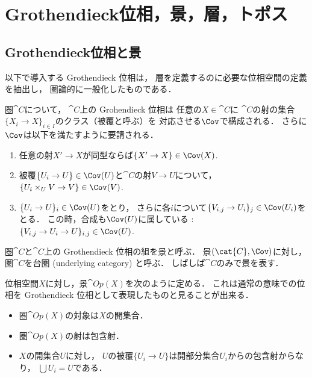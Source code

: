 \section{Grothendieck位相，景，層，トポス}
    \subsection{Grothendieck位相と景}
    以下で導入する Grothendieck 位相は，
    層を定義するのに必要な位相空間の定義を抽出し，
    圏論的に一般化したものである．

    \begin{Def}
        圏$\cat{C}$について，
        $\cat{C}$上の Grohendieck 位相は
        任意の$X \in \cat{C}$に
        $\cat{C}$の射の集合$\{X_i \to X\}_{i \in I}$のクラス（被覆と呼ぶ）を
        対応させる$\Cov$で構成される．
        さらに$\Cov$は以下を満たすように要請される．
        \begin{enumerate}[label=(\alph*)]
            \item
                任意の射$X' \to X$が同型ならば$\{X' \to X\} \in \Cov(X)$.
            \item
                被覆$\{U_i \to U\} \in \Cov(U)$と$\cat{C}$の射$V \to U$について，
                $\{U_i \times_U V \to V\} \in \Cov(V)$.
            \item
                $\{U_i \to U\}_i \in \Cov(U)$をとり，
                さらに各$i$について$\{V_{i,j} \to U_i\}_j \in \Cov(U_i)$をとる．
                この時，合成も$\Cov(U)$に属している : $\{V_{i,j} \to U_i \to U\}_{i,j} \in \Cov(U)$.
        \end{enumerate}
    \end{Def}

    \begin{Def}[景]
        圏$\cat{C}$と$\cat{C}$上の Grothendieck 位相の組を景と呼ぶ．
        景$(\cat{C}, \Cov)$に対し，圏$\cat{C}$を台圏 (underlying category) と呼ぶ．
        しばしば$\cat{C}$のみで景を表す．
    \end{Def}

    \begin{Example}
        位相空間$X$に対し，景$\cat{Op}(X)$を次のように定める．
        これは通常の意味での位相を Grothendieck 位相として表現したものと見ることが出来る．
        \begin{itemize}
            \item 圏$\cat{Op}(X)$の対象は$X$の開集合．
            \item 圏$\cat{Op}(X)$の射は包含射．
            \item
                $X$の開集合$U$に対し，
                $U$の被覆$\{U_i \to U \}$は開部分集合$U_i$からの包含射からなり，
                $\bigcup U_i=U$である．
        \end{itemize}
    \end{Example}

